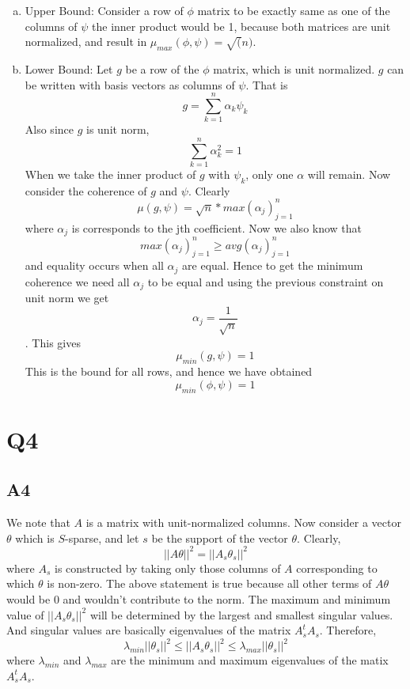 \documentclass{article}
\begin{document}
\begin{enumerate}[(a)]
\item Upper Bound:
  Consider a row of $\phi$ matrix to be exactly same as one of the columns of $\psi$ the inner product would be 1, because both matrices are unit normalized, and result in $\mu_{max}(\phi,\psi) = \sqrt(n)$.
\item Lower Bound:
  Let $g$ be a row of the $\phi$ matrix, which is unit normalized. $g$ can be written with basis vectors as columns of $\psi$. That is
  $$g = \sum_{k=1}^{n}\alpha_k \psi_k$$
  Also since $g$ is unit norm, $$\sum_{k=1}^n\alpha_k^2 = 1$$
  When we take the inner product of $g$ with $\psi_k$, only one $\alpha$ will remain. Now consider the coherence of $g$ and $\psi$. Clearly
  $$\mu(g,\psi) = \sqrt{n} * max(\alpha_j)_{j=1}^n$$ where $\alpha_j$ is corresponds to the jth coefficient. Now we also know that $$max(\alpha_j)_{j=1}^n \ge avg(\alpha_j)_{j=1}^n$$ and equality occurs when all $\alpha_j$ are equal. Hence to get the minimum coherence we need all $\alpha_j$ to be equal and using the previous constraint on unit norm we get $$\alpha_j = \frac{1}{\sqrt{n}}$$. This gives $$\mu_{min}(g,\psi) = 1$$
  This is the bound for all rows, and hence we have obtained $$\mu_{min}(\phi,\psi) = 1$$
\end{enumerate}

\section*{Q4}
\subsection*{A4}
We note that $A$ is a matrix with unit-normalized columns. Now consider a vector $\theta$ which is $S$-sparse, and let $s$ be the support
of the vector $\theta$. Clearly,
$$||A\theta||^2 = ||A_s\theta_s||^2$$
where $A_s$ is constructed by taking only those columns of $A$ corresponding to which $\theta$ is non-zero. The above statement is true
because all other terms of $A\theta$ would be $0$ and wouldn't contribute to the norm.
The maximum and minimum value of $||A_s\theta_s||^2$ will be determined by the largest and smallest singular values. And singular values are basically eigenvalues of the matrix $A_s^tA_s$. Therefore,
$$\lambda_{min}||\theta_s||^2 \leq ||A_s\theta_s||^2 \leq \lambda_{max}||\theta_s||^2$$ 
where $\lambda_{min}$ and $\lambda_{max}$ are the minimum and maximum eigenvalues of the matix  $A_s^tA_s$.
\end{document}
